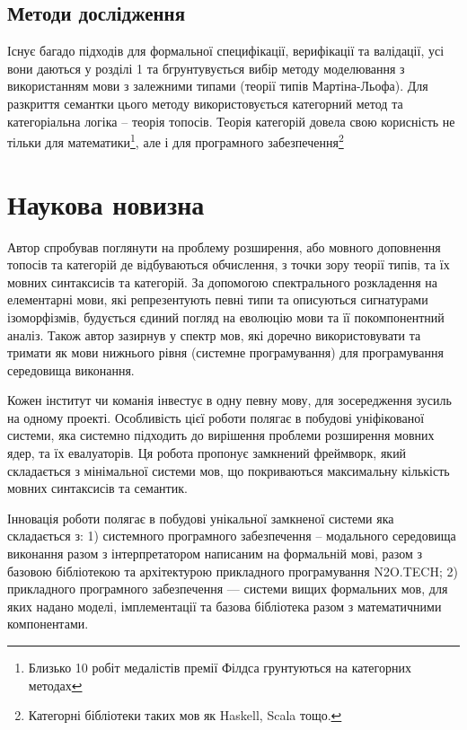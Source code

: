 \subsection{Методи дослідження}
Існує багадо підходів для формальної специфікації,
верифікації та валідації, усі вони даються у розділі 1 та
бгрунтувується вибір методу моделювання з використанням
мови з залежними типами (теорії типів Мартіна-Льофа).
Для разкриття семантки цього методу використовується
категорний метод та категоріальна логіка -- теорія топосів.
Теорія категорій довела свою корисність не тільки для
математики\footnote{Близько 10 робіт медалістів премії
Філдса грунтуються на категорних методах},
але і для програмного
забезпечення\footnote{Категорні бібліотеки таких мов як Haskell, Scala тощо.}

\section{Наукова новизна}
Автор спробував поглянути на проблему розширення, або мовного доповнення
топосів та категорій де відбуваються обчислення, з точки зору теорії типів,
та їх мовних синтаксисів та категорій. За допомогою спектрального розкладення на
елементарні мови, які репрезентують певні типи та описуються сигнатурами ізоморфізмів,
будується єдиний погляд на еволюцію мови та її покомпонентний аналіз. Також автор
зазирнув у спектр мов, які доречно використовувати та тримати як мови нижнього
рівня (системне програмування) для програмування середовища виконання.

Кожен інститут чи команія інвестує в одну певну мову, для зосередження зусиль на одному проекті.
Особливість цієї роботи полягає в побудові уніфікованої системи, яка системно підходить
до вирішення проблеми розширення мовних ядер, та їх евалуаторів. Ця робота
пропонує замкнений фреймворк, який складається з мінімальної системи мов,
що покриваються максимальну кількість мовних синтаксисів та семантик.

Інновація роботи полягає в побудові унікальної замкненої системи яка складається з:
1) системного програмного забезпечення -- модального середовища виконання разом з інтерпретатором
написаним на формальній мові, разом з базовою бібліотекою та архітектурою прикладного програмування N2O.TECH;
2) прикладного програмного забезпечення --- системи вищих формальних мов, для яких надано моделі,
імплементації та базова бібліотека разом з математичними компонентами.


